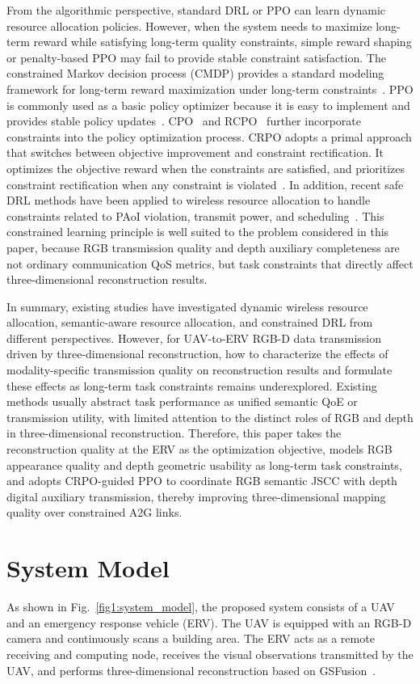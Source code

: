 \documentclass[journal]{IEEEtran}
\begin{document}
From the algorithmic perspective, standard DRL or PPO can learn dynamic resource allocation policies. However, when the system needs to maximize long-term reward while satisfying long-term quality constraints, simple reward shaping or penalty-based PPO may fail to provide stable constraint satisfaction. The constrained Markov decision process (CMDP) provides a standard modeling framework for long-term reward maximization under long-term constraints~\cite{D7}. PPO is commonly used as a basic policy optimizer because it is easy to implement and provides stable policy updates~\cite{D8}. CPO~\cite{D9} and RCPO~\cite{D10} further incorporate constraints into the policy optimization process. CRPO adopts a primal approach that switches between objective improvement and constraint rectification. It optimizes the objective reward when the constraints are satisfied, and prioritizes constraint rectification when any constraint is violated~\cite{D11}. In addition, recent safe DRL methods have been applied to wireless resource allocation to handle constraints related to PAoI violation, transmit power, and scheduling~\cite{D12}. This constrained learning principle is well suited to the problem considered in this paper, because RGB transmission quality and depth auxiliary completeness are not ordinary communication QoS metrics, but task constraints that directly affect three-dimensional reconstruction results.

In summary, existing studies have investigated dynamic wireless resource allocation, semantic-aware resource allocation, and constrained DRL from different perspectives. However, for UAV-to-ERV RGB-D data transmission driven by three-dimensional reconstruction, how to characterize the effects of modality-specific transmission quality on reconstruction results and formulate these effects as long-term task constraints remains underexplored. Existing methods usually abstract task performance as unified semantic QoE or transmission utility, with limited attention to the distinct roles of RGB and depth in three-dimensional reconstruction. Therefore, this paper takes the reconstruction quality at the ERV as the optimization objective, models RGB appearance quality and depth geometric usability as long-term task constraints, and adopts CRPO-guided PPO to coordinate RGB semantic JSCC with depth digital auxiliary transmission, thereby improving three-dimensional mapping quality over constrained A2G links.

\section{System Model}
\label{sec:system_model}
As shown in Fig.~\ref{fig1:system_model}, the proposed system consists of a UAV and an emergency response vehicle (ERV). The UAV is equipped with an RGB-D camera and continuously scans a building area. The ERV acts as a remote receiving and computing node, receives the visual observations transmitted by the UAV, and performs three-dimensional reconstruction based on GSFusion~\cite{A12}.
\end{document}
